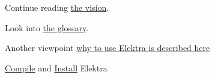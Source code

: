 \begin{DoxyItemize}
\item Continue reading \hyperlink{doc_VISION_md}{the vision}.
\item Look into \hyperlink{doc_help_elektra-glossary_md}{the glossary}.
\item Another viewpoint \hyperlink{doc_help_elektra-introduction_md}{why to use Elektra is described here}
\item \hyperlink{doc_COMPILE_md}{Compile} and \hyperlink{doc_INSTALL_md}{Install} Elektra 
\end{DoxyItemize}